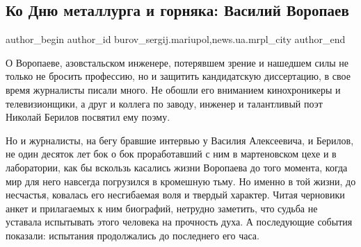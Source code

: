  
 
 
 
 
 
\subsection{Ко Дню металлурга и горняка: Василий Воропаев}
\label{sec:20_07_2019.stz.news.ua.mrpl_city.1.ko_dnu_metallurga_i_gornjaka_vasilij_voropaev}
 
\ifcmt
 author_begin
   author_id burov_sergij.mariupol,news.ua.mrpl_city
 author_end
\fi

О Воропаеве, азовстальском инженере, потерявшем зрение и нашедшем силы не
только не бросить профессию, но и защитить кандидатскую диссертацию, в свое
время журналисты писали много. Не обошли его вниманием кинохроникеры и
телевизионщики, а друг и коллега по заводу, инженер и талантливый поэт Николай
Берилов посвятил ему поэму.

Но и журналисты, на бегу бравшие интервью у Василия Алексеевича, и Берилов, не
один десяток лет бок о бок проработавший с ним в мартеновском цехе и в
лаборатории, как бы вскользь касались жизни Воропаева до того момента, когда
мир для него навсегда погрузился в кромешную тьму. Но именно в той жизни, до
несчастья, ковалась его несгибаемая воля и твердый характер. Читая черновики
анкет и прилагаемых к ним биографий, нетрудно заметить, что судьба не уставала
испытывать этого человека на прочность духа. А последующие события показали:
испытания продолжались до последнего его часа.


